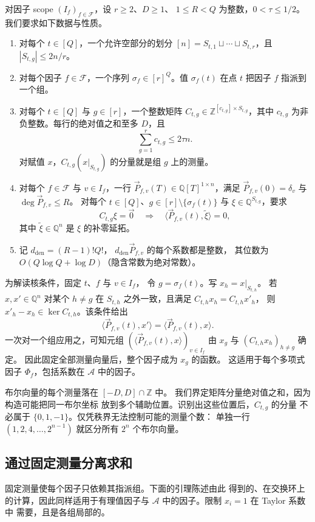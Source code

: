 \begin{definition}\label{def:layout}
对因子 scope $(I_f)_{f\in\mathcal F}$，设 $r\ge2$、$D\ge1$、
$1\le R<Q$ 为整数，$0<\tau\le1/2$。我们要求如下数据与性质。
\begin{enumerate}
\item 对每个 $t\in[Q]$，一个允许空部分的划分
$[n]=S_{t,1}\sqcup\cdots\sqcup S_{t,r}$，且
$|S_{t,g}|\le2n/r$。
\item 对每个因子 $f\in\mathcal F$，一个序列
$\sigma_f\in[r]^Q$。值 $\sigma_f(t)$ 在点 $t$
把因子 $f$ 指派到一个组。
\item 对每个 $t\in[Q]$ 与 $g\in[r]$，一个整数矩阵
$C_{t,g}\in\mathbb Z^{[c_{t,g}]\times S_{t,g}}$，其中
$c_{t,g}$ 为非负整数。每行的绝对值之和至多 $D$，且
\[
 \sum_{g=1}^r c_{t,g}\le2\tau n.
\]
对赋值 $x$，$C_{t,g}(x|_{S_{t,g}})$ 的分量就是组 $g$
上的测量。
\item 对每个 $f\in\mathcal F$ 与 $v\in I_f$，一行
$\vec{P}_{f,v}(T)\in\mathbb Q[T]^{1\times n}$，满足
$\vec{P}_{f,v}(0)=\delta_v$ 与
$\deg \vec{P}_{f,v}\le R$。
对每个 $t\in[Q]$、$g\in[r]\setminus\{\sigma_f(t)\}$ 与
$\xi\in\mathbb Q^{S_{t,g}}$，要求
\[
 C_{t,g}\xi=\vec{0}\quad\Longrightarrow\quad
 \langle \vec{P}_{f,v}(t), \widetilde\xi\rangle=0,
\]
其中 $\widetilde\xi\in\mathbb Q^n$ 是 $\xi$ 的补零延拓。
\item 记 $d_{\mathrm{den}}=(R-1)!Q!$，
$d_{\mathrm{den}} \vec{P}_{f,v}$ 的每个系数都是整数，
其位数为 $O(Q\log Q+\log D)$（隐含常数为绝对常数）。
\end{enumerate}
\end{definition}

为解读核条件，固定 $t$、$f$ 与 $v\in I_f$，
令 $g=\sigma_f(t)$。写 $x_h=x|_{S_{t,h}}$。
若 $x,x'\in\mathbb Q^n$ 对某个 $h\ne g$ 在 $S_{t,h}$
之外一致，且满足 $C_{t,h}x_h=C_{t,h}x'_h$，
则 $x'_h-x_h\in\ker C_{t,h}$。该条件给出
\[
 \langle \vec{P}_{f,v}(t), x'\rangle=\langle \vec{P}_{f,v}(t), x\rangle.
\]
一次对一个组应用之，可知元组
$(\langle \vec{P}_{f,v}(t), x\rangle)_{v\in I_f}$
由 $x_g$ 与 $(C_{t,h}x_h)_{h\ne g}$ 确定。
因此固定全部测量向量后，整个因子成为 $x_g$ 的函数。
这适用于每个多项式因子 $\Phi_f$，包括系数在 $\mathcal A$
中的因子。

布尔向量的每个测量落在 $[-D,D]\cap\mathbb Z$ 中。
我们界定矩阵分量绝对值之和，因为构造可能把同一布尔坐标
放到多个辅助位置。识别出这些位置后，$C_{t,g}$ 的分量
不必属于 $\{0,1,-1\}$。仅凭秩界无法控制可能的测量个数：
单独一行 $(1,2,4,\ldots,2^{n-1})$ 就区分所有 $2^n$
个布尔向量。

\subsection{通过固定测量分离求和}
\label{subsec:measurement-factorization}
固定测量使每个因子只依赖其指派组。下面的引理陈述由此
得到的、在交换环上的计算，因此同样适用于有理值因子与
$\mathcal A$ 中的因子。限制 $x_i=1$ 在 Taylor 系数中
需要，且是各组局部的。

